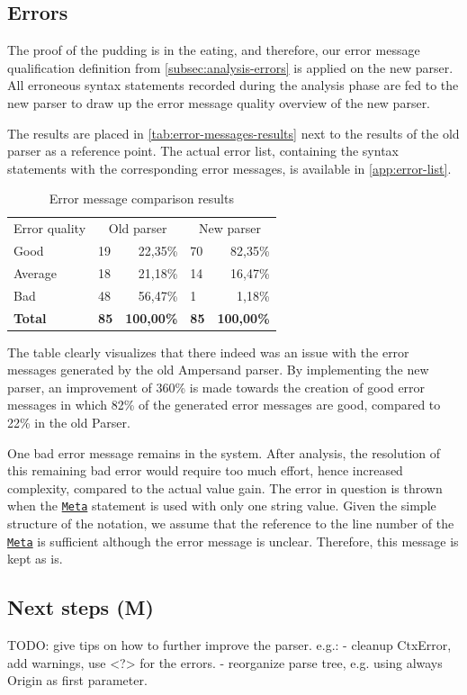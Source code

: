 \subsection{Errors}
\label{subsec:design-errors}
The proof of the pudding is in the eating, and therefore, our error message qualification definition from \autoref{subsec:analysis-errors} is applied on the new parser.
All erroneous syntax statements recorded during the analysis phase are fed to the new parser to draw up the error message quality overview of the new parser.

The results are placed in \autoref{tab:error-messages-results} next to the results of the old parser as a reference point.
The actual error list, containing the syntax statements with the corresponding error messages, is available in \autoref{app:error-list}.

\begin{table}[h]
  \centering
	\begin{tabular}{llrlr}
    Error quality  & \multicolumn{2}{c}{Old parser} & \multicolumn{2}{c}{New parser} \\
		Good           & 19          & 22,35\%          & 70          & 82,35\%          \\
		Average        & 18          & 21,18\%          & 14          & 16,47\%          \\
		Bad            & 48          & 56,47\%          & 1           &  1,18\%          \\
		\rowcolor[HTML]{BBBBBB}
		\textbf{Total} & \textbf{85} & \textbf{100,00\%} & \textbf{85} & \textbf{100,00\%}
	\end{tabular}
  \caption{Error message comparison results}
  \label{tab:error-messages-results}
\end{table}

The table clearly visualizes that there indeed was an issue with the error messages generated by the old Ampersand parser.
By implementing the new parser, an improvement of 360\% is made towards the creation of good error messages in which 82\% of the generated error messages are good, compared to 22\% in the old Parser.

One bad error message remains in the system.
After analysis, the resolution of this remaining bad error would require too much effort, hence increased complexity, compared to the actual value gain.
The error in question is thrown when the \hyperref[fig:ebnf-Meta]{\texttt{Meta}} statement is used with only one string value. 
Given the simple structure of the notation, we assume that the reference to the line number of the \hyperref[fig:ebnf-Meta]{\texttt{Meta}} is sufficient although the error message is unclear.
Therefore, this message is kept as is.

\subsection{Next steps (M)}
\label{subsec:design-next-steps}
TODO: give tips on how to further improve the parser. e.g.:
  - cleanup CtxError, add warnings, use <?> for the errors.
  - reorganize parse tree, e.g. using always Origin as first parameter.